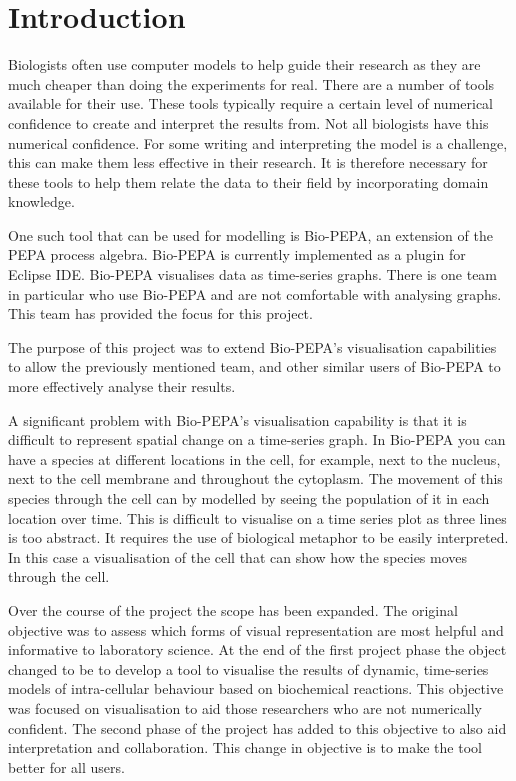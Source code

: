 \section{Introduction}

Biologists often use computer models to help guide their research as they are much cheaper than doing the experiments for real.  There are a number of tools available for their use.  These tools typically require a certain level of numerical confidence to create and interpret the results from.  Not all biologists have this numerical confidence.  For some writing and interpreting the model is a challenge, this can make them less effective in their research.  It is therefore necessary for these tools to help them relate the data to their field by incorporating domain knowledge.

One such tool that can be used for modelling is Bio-PEPA, an extension of the PEPA process algebra.  Bio-PEPA is currently implemented as a plugin for Eclipse IDE.  Bio-PEPA visualises data as time-series graphs.  There is one team in particular who use Bio-PEPA and are not comfortable with analysing graphs.  This team has provided the focus for this project.

The purpose of this project was to extend Bio-PEPA's visualisation capabilities to allow the previously mentioned team, and other similar users of Bio-PEPA to more effectively analyse their results.

A significant problem with Bio-PEPA's visualisation capability is that it is difficult to represent spatial change on a time-series graph.  In Bio-PEPA you can have a species at different locations in the cell, for example, next to the nucleus, next to the cell membrane and throughout the cytoplasm.  The movement of this species through the cell can by modelled by seeing the population of it in each location over time.  This is difficult to visualise on a time series plot as three lines is too abstract.  It requires the use of biological metaphor to be easily interpreted.  In this case a visualisation of the cell that can show how the species moves through the cell.

Over the course of the project the scope has been expanded.  The original objective was to assess which forms of visual representation are most helpful and informative to laboratory science.  At the end of the first project phase the object changed to be to develop a tool to visualise the results of dynamic, time-series models of intra-cellular behaviour based on biochemical reactions.  This objective was focused on visualisation to aid those researchers who are not numerically confident.  The second phase of the project has added to this objective to also aid interpretation and collaboration.  This change in objective is to make the tool better for all users.


